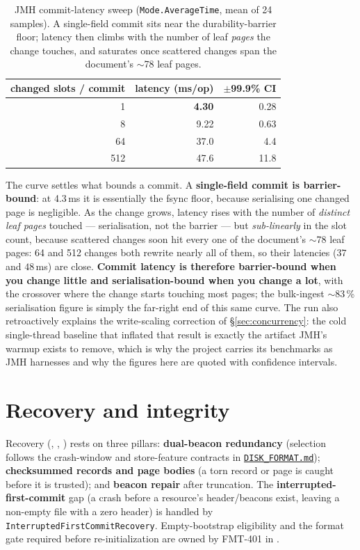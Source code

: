 \documentclass[11pt,a4paper,oneside]{report}
\theoremstyle{sirixthm}
\newcommand{\code}[1]{\texttt{#1}}
\begin{document}
\begin{table}[h]
\centering\footnotesize\setlength{\tabcolsep}{8pt}\renewcommand{\arraystretch}{1.25}
\begin{tabular}{@{}r r r@{}}
\toprule
\textbf{changed slots / commit} & \textbf{latency (ms/op)} & \textbf{$\pm$99.9\% CI}\\
\midrule
1   & \textbf{4.30} & 0.28\\
8   & 9.22 & 0.63\\
64  & 37.0 & 4.4\\
512 & 47.6 & 11.8\\
\bottomrule
\end{tabular}
\caption{JMH commit-latency sweep (\code{Mode.AverageTime}, mean of 24 samples). A single-field commit sits
near the durability-barrier floor; latency then climbs with the number of leaf \emph{pages} the change
touches, and saturates once scattered changes span the document's $\sim$78 leaf pages.}
\label{tab:jmhcommit}
\end{table}

The curve settles what bounds a commit. A \textbf{single-field commit is barrier-bound}: at 4.3\,ms it is
essentially the fsync floor, because serialising one changed page is negligible. As the change grows,
latency rises with the number of \emph{distinct leaf pages} touched --- serialisation, not the barrier ---
but \emph{sub-linearly} in the slot count, because scattered changes soon hit every one of the document's
$\sim$78 leaf pages: 64 and 512 changes both rewrite nearly all of them, so their latencies ($37$ and
$48$\,ms) are close. \textbf{Commit latency is therefore barrier-bound when you change little and
serialisation-bound when you change a lot}, with the crossover where the change starts touching most pages;
the bulk-ingest $\sim$83\,\% serialisation figure is simply the far-right end of this same curve. The run
also retroactively explains the write-scaling correction of \S\ref{sec:concurrency}: the cold single-thread
baseline that inflated that result is exactly the artifact JMH's warmup exists to remove, which is why the
project carries its benchmarks as JMH harnesses and why the figures here are quoted with confidence
intervals.

\section{Recovery and integrity}
\label{sec:recovery}

Recovery (, ,
) rests on three pillars: \textbf{dual-beacon
redundancy} (selection follows the crash-window and store-feature contracts in
\href{DISK_FORMAT.md\#1-files}{\code{DISK\_FORMAT.md}});
\textbf{checksummed records and page bodies} (a torn record or page is caught before it is
trusted); and \textbf{beacon repair} after truncation. The \textbf{interrupted-first-commit}
gap (a crash before a resource's header/beacons exist, leaving a non-empty file with a
zero header) is handled by \code{InterruptedFirstCommitRecovery}. Empty-bootstrap eligibility and
the format gate required before re-initialization are owned by FMT-401 in
.
\end{document}

